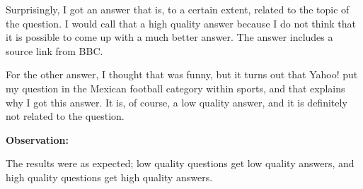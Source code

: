 Surprisingly, I got an answer that is, to a certain extent, related to the topic of the question. I would call that a high quality answer because I do not think that it is possible to come up with a much better answer. The answer includes a source link from BBC. 

For the other answer, I thought that was funny, but it turns out that Yahoo! put my question in the Mexican football category within sports, and that explains why I got this answer. It is, of course, a low quality answer, and it is definitely not related to the question.

\textbf{Observation:}

The results were as expected; low quality questions get low quality answers, and high quality questions get high quality answers.
